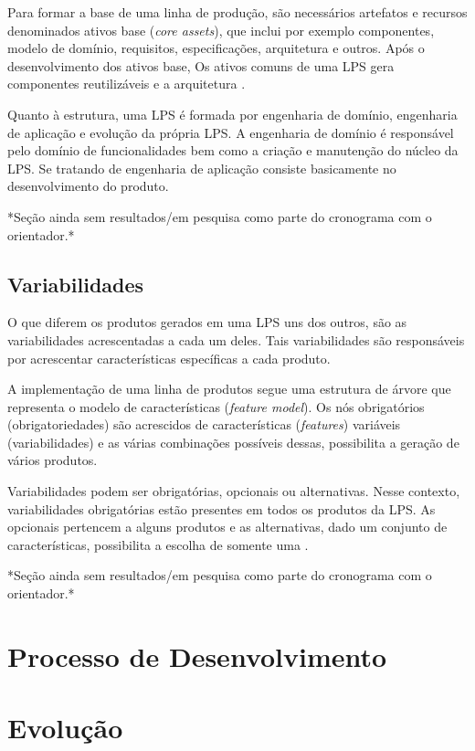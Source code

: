 Para formar a base de uma linha de produção, são necessários artefatos e recursos denominados ativos base (\textit{core assets}), que inclui por exemplo componentes, modelo de domínio, requisitos, especificações, arquitetura e outros. Após o desenvolvimento dos ativos base,  Os ativos comuns de uma LPS gera componentes reutilizáveis e a arquitetura .
 
Quanto à estrutura, uma LPS é formada por engenharia de domínio, engenharia de aplicação e evolução da própria LPS. A engenharia de domínio é responsável pelo domínio de funcionalidades bem como a criação e manutenção do núcleo da LPS. Se tratando de engenharia de aplicação consiste basicamente no desenvolvimento do produto. 

*Seção ainda sem resultados/em pesquisa como parte do cronograma com o orientador.*




\subsection{Variabilidades}

O que diferem os produtos gerados em uma LPS uns dos outros, são as variabilidades acrescentadas a cada um deles. Tais variabilidades são responsáveis por acrescentar características específicas a cada produto.

A implementação de uma linha de produtos segue uma estrutura de árvore que representa o modelo de características (\textit{feature model}). Os nós obrigatórios (obrigatoriedades) são acrescidos de características (\textit{features}) variáveis (variabilidades) e as várias combinações possíveis dessas, possibilita a geração de vários produtos.

Variabilidades podem ser obrigatórias, opcionais ou alternativas. Nesse contexto, variabilidades obrigatórias estão presentes em todos os produtos da LPS. As opcionais pertencem a alguns produtos e as alternativas, dado um conjunto de características, possibilita a escolha de somente uma \cite{colanzi2014abordagem}.

*Seção ainda sem resultados/em pesquisa como parte do cronograma com o orientador.*


\section{Processo de Desenvolvimento}



\section{Evolução}

